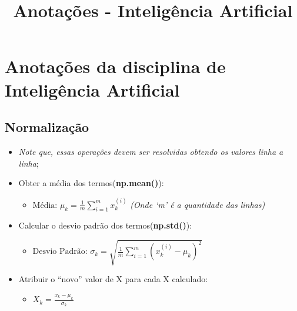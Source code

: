 \documentclass[11pt]{article}
\title{Anotações - Inteligência Artificial}
\providecommand{\tightlist}{%
      \setlength{\itemsep}{0pt}\setlength{\parskip}{0pt}}
\begin{document}
    
    
    \maketitle
    
    

    
    \hypertarget{anotauxe7uxf5es-da-disciplina-de-inteliguxeancia-artificial}{%
\section{\texorpdfstring{\textbf{Anotações da disciplina de Inteligência
Artificial}}{Anotações da disciplina de Inteligência Artificial}}\label{anotauxe7uxf5es-da-disciplina-de-inteliguxeancia-artificial}}

    \hypertarget{normalizauxe7uxe3o}{%
\subsection{\texorpdfstring{\textbf{Normalização}}{Normalização}}\label{normalizauxe7uxe3o}}

\begin{itemize}
\tightlist
\item
  \emph{Note que, essas operações devem ser resolvidas obtendo os
  valores linha a linha};
\item
  Obter a média dos termos(\textbf{np.mean()}):

  \begin{itemize}
  \tightlist
  \item
    \(\text{Média: }\mu_k=\frac{1}{m}\sum\limits_{i=1}^{m}x_k^{(i)}\)
    \emph{(Onde `m' é a quantidade das linhas)}
  \end{itemize}
\item
  Calcular o desvio padrão dos termos(\textbf{np.std()}):

  \begin{itemize}
  \tightlist
  \item
    \(\text{Desvio Padrão: }\sigma_k=\sqrt{\frac{1}{m}\sum\limits_{i=1}^{m}(x_k^{(i)}-\mu_k)^2}\)
  \end{itemize}
\item
  Atribuir o ``novo'' valor de X para cada X calculado:

  \begin{itemize}
  \tightlist
  \item
    \(X_k=\frac{x_k-\mu_k}{\sigma_k}\)
  \end{itemize}
\end{itemize}
\end{document}
